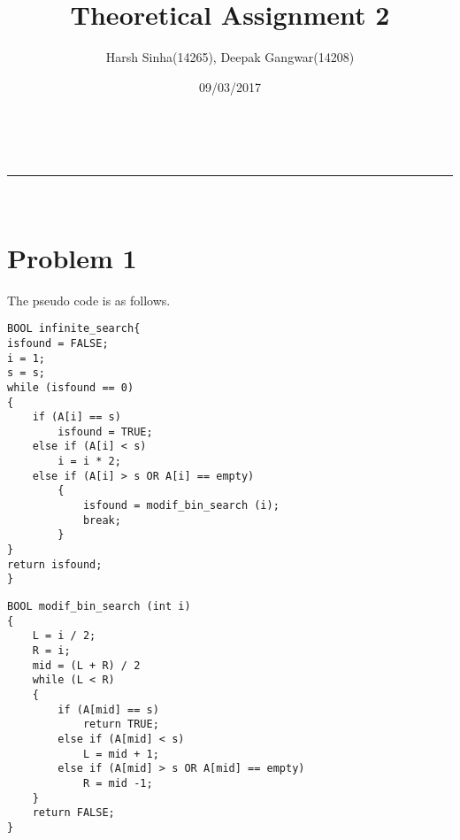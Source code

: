 \documentclass[a4paper,11pt]{article}
\makeatletter
\newcommand{\linia}{\rule{\linewidth}{0.5pt}}
\theoremstyle{mytheor}
\renewcommand{\maketitle}{
\begin{center}
\vspace{2ex}
{\huge \textsc{\@title}}
\vspace{1ex}
\\
\linia\\
\@author \hfill \@date
\vspace{4ex}
\end{center}
}
\makeatother
\begin{document}
\title{Theoretical Assignment \textnumero{} 2}

\author{Harsh Sinha(14265), Deepak Gangwar(14208)}

\date{09/03/2017}

\maketitle

\section*{Problem 1}

The pseudo code is as follows.

\begin{lstlisting}[label={list:first},caption=Pseudo code -- Search in an Infinite Array.]
BOOL infinite_search{
isfound = FALSE;
i = 1;
s = s;
while (isfound == 0)
{
	if (A[i] == s)
		isfound = TRUE;
	else if (A[i] < s)
		i = i * 2;
	else if (A[i] > s OR A[i] == empty)
		{
			isfound = modif_bin_search (i);
			break;
		}
}
return isfound;
}
\end{lstlisting}

\begin{lstlisting}[caption=modif\_bin\_search.]
BOOL modif_bin_search (int i)
{
	L = i / 2;
	R = i;
	mid = (L + R) / 2
	while (L < R)
	{
		if (A[mid] == s)
			return TRUE;
		else if (A[mid] < s)
			L = mid + 1;
		else if (A[mid] > s OR A[mid] == empty)
			R = mid -1;	
	}
	return FALSE;
}
\end{lstlisting}
\end{document}
